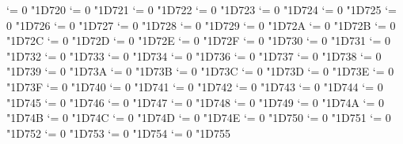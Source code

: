 {  \Umathcode `\Ε = 0 \alphafam "1D720
  \Umathcode `\Ζ = 0 \alphafam "1D721
  \Umathcode `\Η = 0 \alphafam "1D722
  \Umathcode `\Θ = 0 \alphafam "1D723
  \Umathcode `\Ι = 0 \alphafam "1D724
  \Umathcode `\Κ = 0 \alphafam "1D725
  \Umathcode `\Λ = 0 \alphafam "1D726
  \Umathcode `\Μ = 0 \alphafam "1D727
  \Umathcode `\Ν = 0 \alphafam "1D728
  \Umathcode `\Ξ = 0 \alphafam "1D729
  \Umathcode `\Ο = 0 \alphafam "1D72A
  \Umathcode `\Π = 0 \alphafam "1D72B
  \Umathcode `\Ρ = 0 \alphafam "1D72C
  \Umathcode `\ϴ = 0 \alphafam "1D72D
  \Umathcode `\Σ = 0 \alphafam "1D72E
  \Umathcode `\Τ = 0 \alphafam "1D72F
  \Umathcode `\Υ = 0 \alphafam "1D730
  \Umathcode `\Φ = 0 \alphafam "1D731
  \Umathcode `\Χ = 0 \alphafam "1D732
  \Umathcode `\Ψ = 0 \alphafam "1D733
  \Umathcode `\Ω = 0 \alphafam "1D734
  \Umathcode `\α = 0 \alphafam "1D736
  \Umathcode `\β = 0 \alphafam "1D737
  \Umathcode `\γ = 0 \alphafam "1D738
  \Umathcode `\δ = 0 \alphafam "1D739
  \Umathcode `\ε = 0 \alphafam "1D73A
  \Umathcode `\ζ = 0 \alphafam "1D73B
  \Umathcode `\η = 0 \alphafam "1D73C
  \Umathcode `\θ = 0 \alphafam "1D73D
  \Umathcode `\ι = 0 \alphafam "1D73E
  \Umathcode `\κ = 0 \alphafam "1D73F
  \Umathcode `\λ = 0 \alphafam "1D740
  \Umathcode `\μ = 0 \alphafam "1D741
  \Umathcode `\ν = 0 \alphafam "1D742
  \Umathcode `\ξ = 0 \alphafam "1D743
  \Umathcode `\ο = 0 \alphafam "1D744
  \Umathcode `\π = 0 \alphafam "1D745
  \Umathcode `\ρ = 0 \alphafam "1D746
  \Umathcode `\ς = 0 \alphafam "1D747
  \Umathcode `\σ = 0 \alphafam "1D748
  \Umathcode `\τ = 0 \alphafam "1D749
  \Umathcode `\υ = 0 \alphafam "1D74A
  \Umathcode `\ϕ = 0 \alphafam "1D74B
  \Umathcode `\χ = 0 \alphafam "1D74C
  \Umathcode `\ψ = 0 \alphafam "1D74D
  \Umathcode `\ω = 0 \alphafam "1D74E
  \Umathcode `\ϵ = 0 \alphafam "1D750
  \Umathcode `\ϑ = 0 \alphafam "1D751
  \Umathcode `\ϰ = 0 \alphafam "1D752
  \Umathcode `\φ = 0 \alphafam "1D753
  \Umathcode `\ϱ = 0 \alphafam "1D754
  \Umathcode `\ϖ = 0 \alphafam "1D755
\fi
\tenbfit}
\let\itbf=\bfit

